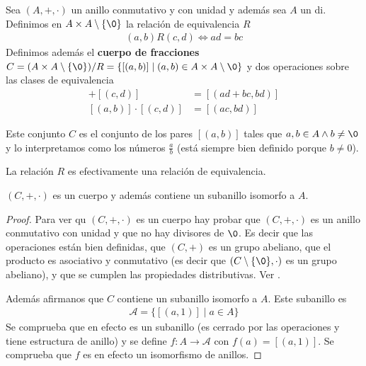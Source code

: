 \begin{dfn}
	Sea $(A, +, \cdot)$ un anillo conmutativo y con unidad y además sea $A$ un \gls{di}. Definimos en $A \times A\setminus\{\0\}$ la relación de equivalencia $R$
	\begin{align}
		(a,b) R (c,d) \iff ad = bc
	\end{align}
	Definimos además el \textbf{cuerpo de fracciones} $C = (A\times A\setminus \{\0\})/ R = \{[(a,b)] \mid (a,b) \in A\times A\setminus \0\}$ y dos operaciones sobre las clases de equivalencia
	\begin{align}
		[(a,b)]+[(c,d)] &= [(ad+bc, bd)] \\
		[(a,b)]\cdot[(c,d)] &= [(ac,bd)]
	\end{align}
\end{dfn}

Este conjunto $C$ es el conjunto de los pares $[(a,b)]$ tales que $a,b \in A \land b \neq \0$ y lo interpretamos como los números $\frac{a}{b}$ (está siempre bien definido porque $b \neq 0$).

\begin{pro}
	La relación $R$ es efectivamente una relación de equivalencia.
\end{pro}

\begin{thm}
	$(C, +, \cdot)$ es un cuerpo y además contiene un subanillo isomorfo a $A$.
\end{thm}

\begin{proof}
	Para ver qu $(C, +, \cdot)$ es un cuerpo hay probar que $(C, +, \cdot)$ es un anillo conmutativo con unidad y que no hay divisores de $\0$. Es decir que las operaciones están bien definidas, que $(C,+)$ es un grupo abeliano, que el producto es asociativo y conmutativo (es decir que $(C\setminus \{\0\}, \cdot)$ es un grupo abeliano), y que se cumplen las propiedades distributivas. Ver \cite[p.209]{dor96}.
	
	Además afirmanos que $C$ contiene un subanillo isomorfo a $A$. Este subanillo es
	\begin{align*}
		\mathcal{A} = \{[(a, 1)] \mid a \in A\}
	\end{align*}
	Se comprueba que en efecto es un subanillo (es cerrado por las operaciones y tiene estructura de anillo) y se define $f:A \to \mathcal{A}$ con $f(a) = [(a, 1)]$. Se comprueba que $f$ es en efecto un isomorfismo de anillos.
\end{proof}

